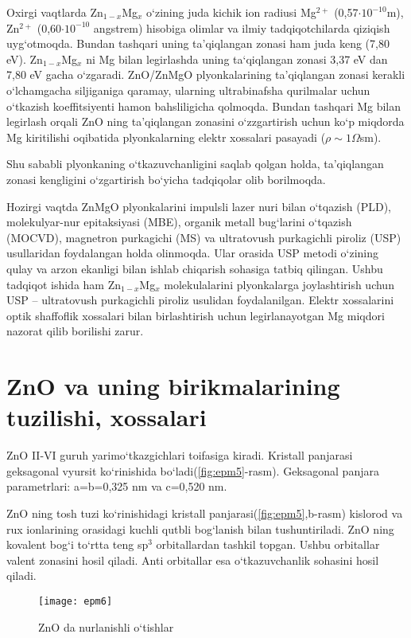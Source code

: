 \documentclass[14pt]{article}
\begin{document}
	Oxirgi vaqtlarda  Zn$_{1-x}$Mg$_{x}$ o`zining juda kichik ion radiusi Mg$^{2+}$ (0,57$\cdot 10^{-10}$m), Zn$^{2+}$ (0,60$\cdot 10^{-10}$ angstrem) hisobiga olimlar va ilmiy tadqiqotchilarda qiziqish uyg`otmoqda. Bundan tashqari uning ta'qiqlangan zonasi ham juda keng (7,80 eV). Zn$_{1-x}$Mg$_{x}$ ni  Mg bilan legirlashda uning ta`qiqlangan zonasi 3,37 eV dan 7,80 eV gacha o`zgaradi. ZnO/ZnMgO plyonkalarining ta'qiqlangan zonasi kerakli o`lchamgacha siljiganiga qaramay, ularning ultrabinafsha qurilmalar uchun o`tkazish koeffitsiyenti hamon bahsliligicha qolmoqda. Bundan tashqari Mg bilan legirlash orqali ZnO ning ta'qiqlangan zonasini o`zzgartirish uchun ko`p miqdorda Mg kiritilishi oqibatida plyonkalarning elektr xossalari pasayadi ($\rho\sim 1 \Omega$sm). 
	
	Shu sababli plyonkaning o`tkazuvchanligini saqlab qolgan holda, ta'qiqlangan zonasi kengligini o`zgartirish bo`yicha tadqiqolar olib borilmoqda. 
	
	Hozirgi vaqtda ZnMgO plyonkalarini impulsli lazer nuri bilan o`tqazish (PLD), molekulyar-nur epitaksiyasi (MBE), organik metall bug`larini o`tqazish (MOCVD), magnetron purkagichi (MS) va ultratovush purkagichli piroliz (USP) usullaridan foydalangan holda olinmoqda. Ular orasida USP metodi o`zining qulay va arzon ekanligi bilan ishlab chiqarish sohasiga tatbiq qilingan. 
	Ushbu tadqiqot ishida ham Zn$_{1-x}$Mg$_{x}$ molekulalarini plyonkalarga joylashtirish uchun USP -- ultratovush purkagichli piroliz usulidan foydalanilgan. Elektr xossalarini optik shaffoflik xossalari bilan birlashtirish uchun legirlanayotgan Mg miqdori nazorat qilib borilishi zarur. 
	
	 
	\section{ZnO va uning birikmalarining tuzilishi, xossalari}
	ZnO II-VI guruh yarimo`tkazgichlari toifasiga kiradi. Kristall panjarasi geksagonal vyursit ko`rinishida bo`ladi(\ref{fig:epm5}-rasm). Geksagonal panjara parametrlari: a=b=0,325 nm va c=0,520 nm. 
	
	ZnO ning tosh tuzi ko`rinishidagi kristall panjarasi(\ref{fig:epm5},b-rasm) kislorod va rux ionlarining orasidagi kuchli qutbli bog`lanish bilan tushuntiriladi. ZnO ning kovalent bog`i to`rtta teng sp$^{3}$ orbitallardan tashkil topgan. Ushbu orbitallar valent zonasini hosil qiladi. Anti orbitallar esa o`tkazuvchanlik sohasini hosil qiladi. 
	
	
\begin{figure*}[h]
	\centering
	\texttt{[image: epm6]}
	\caption{ZnO da nurlanishli o`tishlar}
	\label{fig:epm6}
\end{figure*}
	
\end{document}
